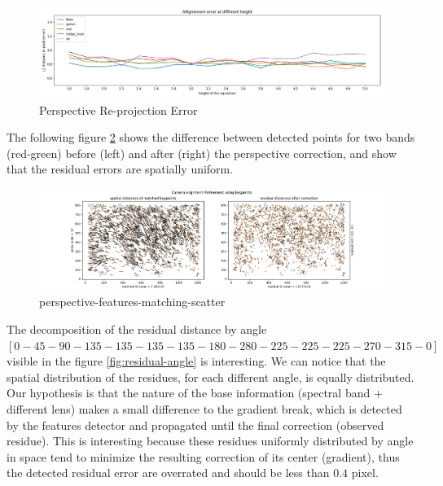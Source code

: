 \documentclass[]{elsarticle}
\begin{document}
	\begin{figure}[!htb]
		\centering
		\includegraphics[width=\linewidth]{../figures/prespective-allignement-rmse.jpg}
		\caption{Perspective Re-projection Error}
		\label{fig:perspective-error}
	\end{figure}
	
	The following figure \ref{fig:perspective-features-matching-scatter} shows the difference between detected points for two bands (red-green)
	before (left) and after (right) the perspective correction, and show that the residual errors are spatially uniform.
	
	\begin{figure}[!htb]
		\centering
		\includegraphics[width=\linewidth]{../figures/perspective-features-matching-scatter.png}
		\caption{perspective-features-matching-scatter}
		\label{fig:perspective-features-matching-scatter}
	\end{figure}
	
	
	The decomposition of the residual distance by angle $[0-45-90-135-135-135-135-180-280-225-225-225-270-315-0]$ visible in the figure \ref{fig:residual-angle} is interesting.
	We can notice that the spatial distribution of the residues, for each different angle, is equally distributed.
	Our hypothesis is that the nature of the base information (spectral band + different lens) makes a small difference to the gradient break,
	which is detected by the features detector and propagated until the final correction (observed residue).
	This is interesting because these residues uniformly distributed by angle in space tend to minimize the resulting correction of its center (gradient),
	thus the detected residual error are overrated and should be less than $0.4$ pixel.
	\\
	
\end{document}

